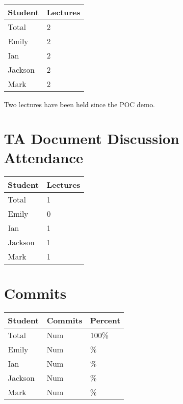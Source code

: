 \documentclass{article}
\begin{document}
\begin{table}[H]
\centering
\begin{tabular}{ll}
\toprule
\textbf{Student} & \textbf{Lectures}\\
\midrule
Total & 2\\
Emily & 2\\
Ian & 2\\
Jackson & 2\\
Mark & 2\\
\bottomrule
\end{tabular}
\end{table}

Two lectures have been held since the POC demo.

\section{TA Document Discussion Attendance}

\begin{table}[H]
\centering
\begin{tabular}{ll}
\toprule
\textbf{Student} & \textbf{Lectures}\\
\midrule
Total & 1\\
Emily & 0\\
Ian & 1\\
Jackson & 1\\
Mark & 1\\
\bottomrule
\end{tabular}
\end{table}

\section{Commits}


\begin{table}[H]
\centering
\begin{tabular}{lll}
\toprule
\textbf{Student} & \textbf{Commits} & \textbf{Percent}\\
\midrule
Total & Num & 100\% \\
Emily & Num & \%\\
Ian & Num & \%\\
Jackson & Num & \%\\
Mark & Num & \%\\
\bottomrule
\end{tabular}
\end{table}
\end{document}
